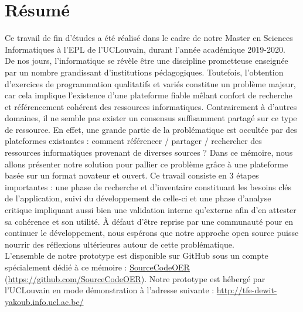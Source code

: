 \chapter*{Résumé}

Ce travail de fin d'études a été réalisé dans le cadre de notre Master en Sciences Informatiques à l'EPL de l'UCLouvain, durant l'année académique 2019-2020.\\

De nos jours, l’informatique se révèle être une discipline prometteuse enseignée par un nombre grandissant d’institutions pédagogiques.
Toutefois, l'obtention d’exercices de programmation qualitatifs et variés constitue un problème majeur, car cela implique l'existence d'une plateforme fiable mêlant confort de recherche et référencement cohérent des ressources informatiques.
Contrairement à d'autres domaines, il ne semble pas exister un consensus suffisamment partagé sur ce type de ressource. En effet, une grande partie de la problématique est occultée par des plateformes existantes : comment référencer / partager / rechercher des ressources informatiques provenant de diverses sources ?
Dans ce mémoire, nous allons présenter notre solution pour pallier ce problème grâce à une plateforme basée sur un format novateur et ouvert.
Ce travail consiste en 3 étapes importantes : une phase de recherche et d'inventaire constituant les besoins clés de l'application, suivi du développement de celle-ci et une phase d'analyse critique impliquant aussi bien une validation interne qu'externe afin d'en attester sa cohérence et son utilité.
À défaut d'être reprise par une communauté pour en continuer le développement, nous espérons que notre approche open source puisse nourrir des réflexions ultérieures autour de cette problématique.\\

L'ensemble de notre prototype est disponible sur GitHub sous un compte spécialement dédié à ce mémoire : 
\href{https://github.com/SourceCodeOER}{SourceCodeOER} (\href{https://github.com/SourceCodeOER}{https://github.com/SourceCodeOER}). 
Notre prototype est hébergé par l'UCLouvain en mode démonstration à l'adresse suivante : \href{http://tfe-dewit-yakoub.info.ucl.ac.be/}{http://tfe-dewit-yakoub.info.ucl.ac.be/} \\

\iffalse

